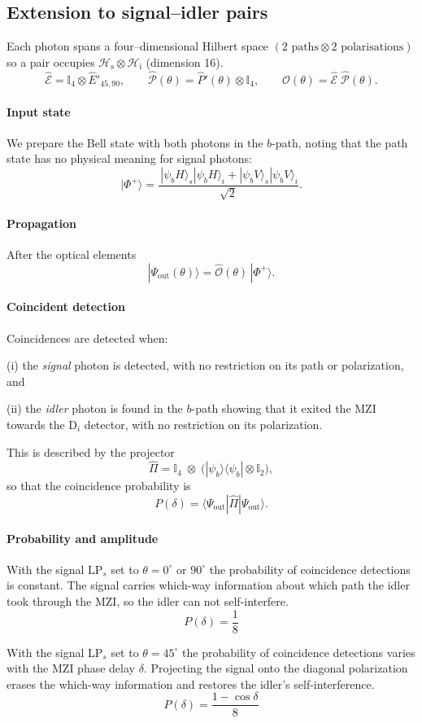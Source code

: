 \documentclass{article}
\begin{document}
\subsection*{Extension to signal–idler pairs}

Each photon spans a four–dimensional Hilbert space
\((2\text{ paths} \otimes 2\text{ polarisations})\)
so a pair occupies
\(\mathcal{H}_{\mathrm{s}}\otimes\mathcal{H}_{\mathrm{i}}\) (dimension 16).
\[
\hat{\mathcal{E}}=
\mathbb{I}_{4}\otimes\hat{E}'_{45,90},\qquad
\hat{\mathcal{P}}(\theta)=\hat{P}'(\theta)\otimes\mathbb{I}_{4},\qquad
\hat{\mathcal{O}}(\theta)=\hat{\mathcal{E}}\;\hat{\mathcal{P}}(\theta).
\]

\paragraph{Input state}

We prepare the Bell state with both photons in the \(b\)-path,
noting that the path state has no physical meaning for signal photons:
\[
|\Phi^{+}\rangle=
\frac{\,|\psi_bH\rangle_{\!s}|\psi_bH\rangle_{\!i}
      +|\psi_bV\rangle_{\!s}|\psi_bV\rangle_{\!i}}{\sqrt{2}}.
\]

\paragraph{Propagation}

After the optical elements
\[
|\Psi_{\mathrm{out}}(\theta)\rangle
=\hat{\mathcal{O}}(\theta)\,|\Phi^{+}\rangle.
\]

\paragraph{Coincident detection}
Coincidences are detected when:

(i) the \emph{signal} photon is detected, with no restriction on its path or polarization, and

(ii) the \emph{idler} photon is found in the \(b\)-path showing that it exited the MZI towards the D$_i$ detector, with no restriction on its polarization.

This is described by the projector
\[
\hat{\Pi}=\mathbb{I}_{4}\;\otimes\;
\bigl(|\psi_b\rangle\langle\psi_b|\otimes\mathbb{I}_{2}\bigr),
\]
so that the coincidence probability is
\[
P(\delta)=\langle\Psi_{\mathrm{out}}|\hat{\Pi}|\Psi_{\mathrm{out}}\rangle.
\]

\paragraph{Probability and amplitude}

With the signal LP$_s$ set to $\theta=0^\circ$ or $90^\circ$ the probability of
coincidence detections is constant.
The signal carries which-way information about which path the idler took
through the MZI, so the idler can not self-interfere.
\[
P(\delta)=\frac{1}{8}
\]

With the signal LP$_s$ set to $\theta=45^\circ$ the probability of
coincidence detections varies with the MZI phase delay $\delta$.
Projecting the signal onto the diagonal polarization erases the
which-way information and restores the idler's self-interference.
\[
P(\delta)=\frac{1-\cos\delta}{8}
\]
\end{document}
